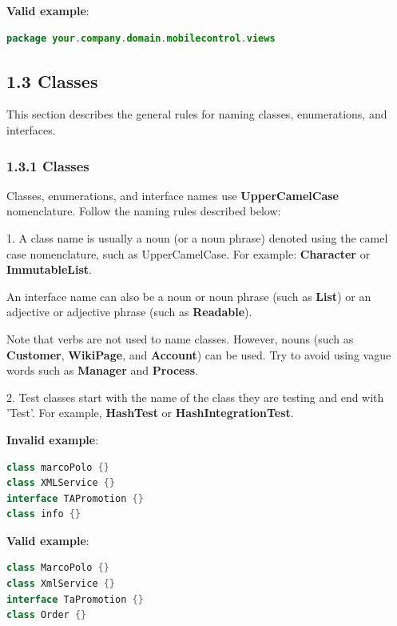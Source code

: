 {{{{{{{{{{{{{{{{\textbf{Valid example}: 

\begin{lstlisting}[language=Kotlin]
package your.company.domain.mobilecontrol.views
\end{lstlisting}


\subsection*{\textbf{1.3 Classes}}

\label{sec:1.3}

This section describes the general rules for naming classes, enumerations, and interfaces.

\subsubsection*{\textbf{1.3.1 Classes}}
\leavevmode\newline

\label{sec:1.3.1}

Classes, enumerations, and interface names use \textbf{UpperCamelCase} nomenclature. Follow the naming rules described below:

1.	A class name is usually a noun (or a noun phrase) denoted using the camel case nomenclature, such as UpperCamelCase. For example: \textbf{Character} or \textbf{ImmutableList}.

An interface name can also be a noun or noun phrase (such as \textbf{List}) or an adjective or adjective phrase (such as \textbf{Readable}).

Note that verbs are not used to name classes. However, nouns (such as \textbf{Customer}, \textbf{WikiPage}, and \textbf{Account}) can be used. Try to avoid using vague words such as \textbf{Manager} and \textbf{Process}.



2.	Test classes start with the name of the class they are testing and end with 'Test'. For example, \textbf{HashTest} or \textbf{HashIntegrationTest}.



\textbf{Invalid example}: 

\begin{lstlisting}[language=Kotlin]
class marcoPolo {} 
class XMLService {} 
interface TAPromotion {}
class info {}
\end{lstlisting}


\textbf{Valid example}: 

\begin{lstlisting}[language=Kotlin]
class MarcoPolo {}
class XmlService {}
interface TaPromotion {}
class Order {}
\end{lstlisting}


}}}}}}}}}}}}}}}}
